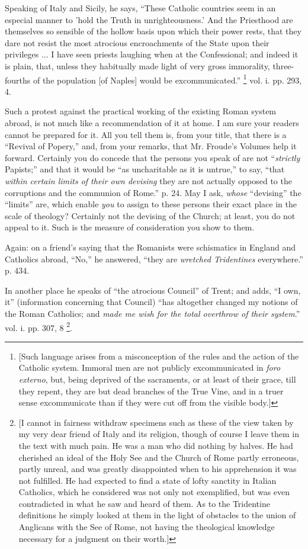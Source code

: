 Speaking of Italy and Sicily, he says, ``These
Catholic countries seem in an especial manner to 'hold the Truth in
unrighteousness.' And the Priesthood are themselves so sensible of the
hollow basis upon which their power rests, that they dare not resist
the most atrocious encroachments of the State upon their privileges
... I have seen priests laughing when at the Confessional; and indeed
it is plain, that, unless they habitually made light of very gross
immorality, three-fourths of the population [of Naples] would be
excommunicated.'' \footnote{[Such language arises from a misconception of the rules and the action
of the Catholic system. Immoral men are not publicly excommunicated in
\emph{foro externo}, but, being deprived of the sacraments, or at
least of their grace, till they repent, they are but dead branches of
the True Vine, and in a truer sense excommunicate than if they were
cut off from the visible body.]} vol. i. pp. 293, 4.

Such a protest against the practical working of
the existing Roman system abroad, is not much like a recommendation of
it at home. I am sure your readers cannot be prepared for it. All you
tell them is, from your title, that there is a ``Revival of
Popery,'' and, from your remarks, that Mr. Froude's Volumes help it
forward. Certainly you do concede that the persons you speak of are
not ``\emph{strictly} Papists;'' and that it would be ``as
uncharitable as it is untrue,'' to say, ``that \emph{within certain
limits of their own devising} they are not actually opposed to the
corruptions and the communion of Rome.'' p. 24. May I ask, \emph{whose}
``devising'' the ``limits'' are, which enable \emph{you} to assign
to these persons their exact place in the scale of theology? Certainly
not the devising of the Church; at least, you do not appeal to it.
Such is the measure of consideration you show to them.

Again: on a friend's saying that the Romanists
were schismatics in England and Catholics abroad, ``No,'' he
answered, ``they are \emph{wretched Tridentines} everywhere.'' p.
434.

In another place he speaks of ``the atrocious
Council'' of Trent; and adds, ``I own, it'' (information concerning
that Council) ``has altogether changed my notions of the Roman
Catholics; and \emph{made me wish for the total overthrow of their system}.''
vol. i. pp. 307, 8 \footnote{[I cannot in fairness withdraw specimens such as these of the view
taken by my very dear friend of Italy and its religion, though of
course I leave them in the text with much pain. He was a man who did
nothing by halves. He had cherished an ideal of the Holy See and the
Church of Rome partly erroneous, partly unreal, and was greatly
disappointed when to his apprehension it was not fulfilled. He had
expected to find a state of lofty sanctity in Italian Catholics, which
he considered was not only not exemplified, but was even contradicted
in what he saw and heard of them. As to the Tridentine definitions he
simply looked at them in the light of obstacles to the union of
Anglicans with the See of Rome, not having the theological knowledge
necessary for a judgment on their worth.]}.

